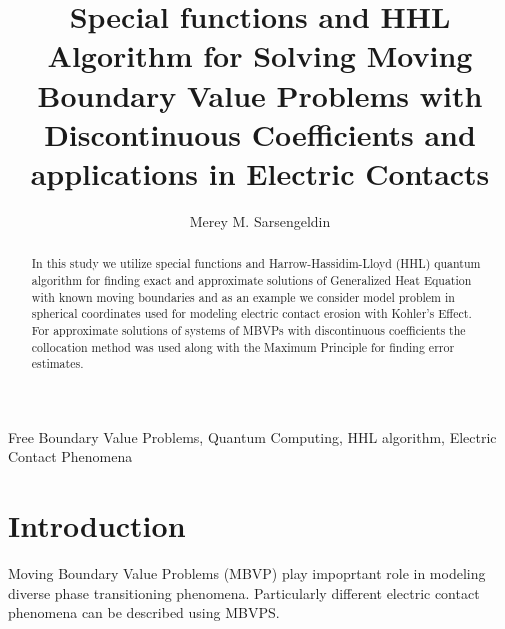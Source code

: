 \documentclass[review]{elsarticle}
\begin{document}
\begin{frontmatter}

\title{Special functions and HHL Algorithm for Solving Moving Boundary Value Problems with Discontinuous Coefficients and applications in Electric Contacts}



\author[mymainaddress,mythirdaddress]{Merey M. Sarsengeldin}



\address[mymainaddress]{Department of Mathematics, University of Central Florida, Orlando, FL, US}
\address[mythirdaddress]{Satbayev University, Almaty, Kazakhstan}
\begin{abstract}
In this study we utilize special functions and Harrow-Hassidim-Lloyd (HHL) quantum algorithm for finding exact and approximate solutions of Generalized Heat Equation with known moving boundaries and as an example we consider model problem in spherical coordinates used for modeling electric contact erosion with Kohler's Effect. For approximate solutions of systems of MBVPs with discontinuous coefficients the collocation method was used along with the Maximum Principle for finding error estimates.
\end{abstract}

\begin{keyword}
Free Boundary Value Problems, Quantum Computing, HHL algorithm, Electric Contact Phenomena
\end{keyword}

\end{frontmatter}

\linenumbers

\section{Introduction}
Moving Boundary Value Problems (MBVP) play impoprtant role in modeling diverse phase transitioning  phenomena. Particularly different electric contact phenomena can be described using MBVPS. 
\end{document}
